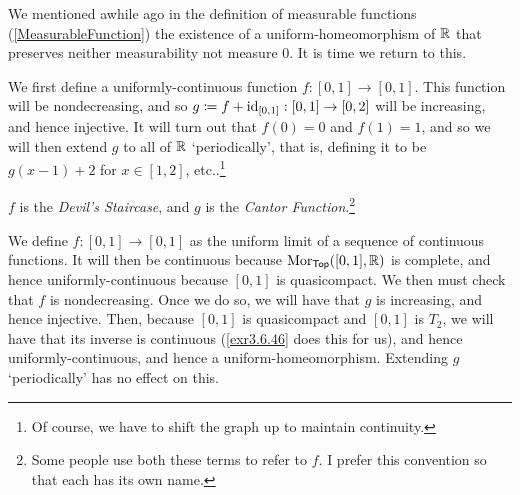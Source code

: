 We mentioned awhile ago in the definition of measurable functions (\cref{MeasurableFunction}) the existence of a uniform-homeomorphism of $\mathbb{R}$ that preserves neither measurability not measure $0$.  It is time we return to this.
\begin{exm}\label{CantorFunction}
\begin{savenotes}
We first define a uniformly-continuous function $f:[0,1]\rightarrow [0,1]$.  This function will be nondecreasing, and so $g\coloneqq f+\operatorname{id} _{[0,1]}:[0,1]\rightarrow [0,2]$ will be increasing, and hence injective.  It will turn out that $f(0)=0$ and $f(1)=1$, and so we will then extend $g$ to all of $\mathbb{R}$ `periodically', that is, defining it to be $g(x-1)+2$ for $x\in [1,2]$, etc..\footnote{Of course, we have to shift the graph up to maintain continuity.} 
\begin{rmk}
$f$ is the \emph{Devil's Staircase}, and $g$ is the \emph{Cantor Function}.\footnote{Some people use both these terms to refer to $f$.  I prefer this convention so that each has its own name.}
\end{rmk}

We define $f:[0,1]\rightarrow [0,1]$ as the uniform limit of a sequence of continuous functions.  It will then be continuous because $\operatorname{Mor} _{\mathsf{Top}}([0,1],\mathbb{R} )$ is complete, and hence uniformly-continuous because $[0,1]$ is quasicompact.  We then must check that $f$ is nondecreasing.  Once we do so, we will have that $g$ is increasing, and hence injective.  Then, because $[0,1]$ is quasicompact and $[0,1]$ is $T_2$, we will have that its inverse is continuous (\cref{exr3.6.46} does this for us), and hence uniformly-continuous, and hence a uniform-homeomorphism.  Extending $g$ `periodically' has no effect on this.


\end{savenotes}
\end{exm}

